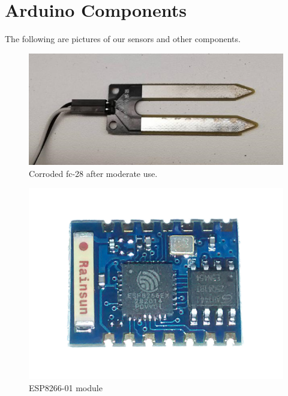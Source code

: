 \documentclass[a4paper,12pt,oneside,openright,titlepage]{book}
\begin{document}
\chapter{Arduino Components}
The following are pictures of our sensors and other components.


\begin{figure}[!ht]
  \centering
      \includegraphics{fc-28-corrosion}
  \caption{Corroded fc-28 after moderate use.}
  \label{fig:resistive}
\end{figure}


\begin{figure}[!ht]
	\centering
		\includegraphics[scale=0.10]{ESP-01}
	\caption{ESP8266-01 module}
	\label{fig:ESP}
\end{figure}
\end{document}
